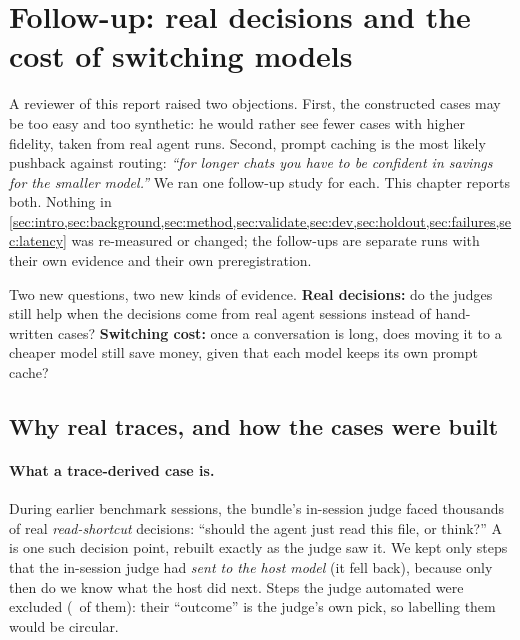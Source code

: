 \section{Follow-up: real decisions and the cost of switching models}\label{sec:followup}

A reviewer of this report raised two objections. First, the constructed cases may be too easy and too
synthetic: he would rather see fewer cases with higher fidelity, taken from real agent runs. Second, prompt
caching is the most likely pushback against routing: \emph{``for longer chats you have to be confident in
savings for the smaller model.''} We ran one follow-up study for each. This chapter reports both. Nothing in
\cref{sec:intro,sec:background,sec:method,sec:validate,sec:dev,sec:holdout,sec:failures,sec:latency} was
re-measured or changed; the follow-ups are separate runs with their own evidence and their own
preregistration.

\begin{keyidea}
Two new questions, two new kinds of evidence. \textbf{Real decisions:} do the judges still help when the
decisions come from real agent sessions instead of hand-written cases? \textbf{Switching cost:} once a
conversation is long, does moving it to a cheaper model still save money, given that each model keeps its
own prompt cache?
\end{keyidea}

\subsection{Why real traces, and how the cases were built}\label{sec:traces}

\paragraph{What a trace-derived case is.} During earlier benchmark sessions, the bundle's in-session judge
faced thousands of real \emph{read-shortcut} decisions: ``should the agent just read this file, or think?''
A  is one such decision point, rebuilt exactly as the judge saw it. We kept only
steps that the in-session judge had \emph{sent to the host model} (it fell back), because only then do we
know what the host did next. Steps the judge automated were excluded (\TrFastRouted\ of them): their
``outcome'' is the judge's own pick, so labelling them would be circular.

